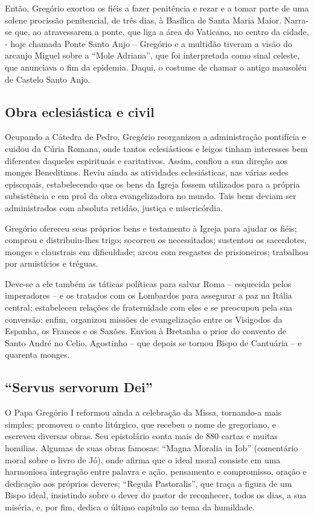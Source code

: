 \documentclass[a4paper,14pt]{extarticle} \usepackage[utf8]{inputenc}
\begin{document}
Então, Gregório exortou os fiéis a fazer penitência e rezar e a tomar parte de uma solene procissão penitencial, de três dias, à Basílica de Santa Maria Maior. Narra-se que, ao atravessarem a ponte, que liga a área do Vaticano, no centro da cidade, - hoje chamada Ponte Santo Anjo – Gregório e a multidão tiveram a visão do arcanjo Miguel sobre a “Mole Adriana”, que foi interpretada como sinal celeste, que anunciava o fim da epidemia. Daqui, o costume de chamar o antigo mausoléu de Castelo Santo Anjo.

\subsection{Obra eclesiástica e civil}

Ocupando a Cátedra de Pedro, Gregório reorganizou a administração pontifícia e cuidou da Cúria Romana, onde tantos eclesiásticos e leigos tinham interesses bem diferentes daqueles espirituais e caritativos. Assim, confiou a sua direção aos monges Beneditinos. Reviu ainda as atividades eclesiásticas, nas várias sedes episcopais, estabelecendo que os bens da Igreja fossem utilizados para a própria subsistência e em prol da obra evangelizadora no mundo. Tais bens deviam ser administrados com absoluta retidão, justiça e misericórdia.

Gregório ofereceu seus próprios bens e testamento à Igreja para ajudar os fiéis; comprou e distribuiu-lhes trigo; socorreu os necessitados; sustentou os sacerdotes, monges e claustrais em dificuldade; arcou com resgastes de prisioneiros; trabalhou por armistícios e tréguas.

Deve-se a ele também as táticas políticas para salvar Roma – esquecida pelos imperadores – e os tratados com os Lombardos para assegurar a paz na Itália central; estabeleceu relações de fraternidade com eles e se preocupou pela sua conversão; enfim, organizou missões de evangelização entre os Visigodos da Espanha, os Francos e os Saxões. Enviou à Bretanha o prior do convento de Santo André no Celio, Agostinho – que depois se tornou Bispo de Cantuária – e quarenta monges.

\subsection{“Servus servorum Dei”}

O Papa Gregório I reformou ainda a celebração da Missa, tornando-a mais simples; promoveu o canto litúrgico, que recebeu o nome de gregoriano, e escreveu diversas obras. Seu epistolário conta mais de 880 cartas e muitas homilias. Algumas de suas obras famosas: “Magna Moralia in Iob” (comentário moral sobre o livro de Jó), onde afirma que o ideal moral consiste em uma harmoniosa integração entre palavra e ação, pensamento e compromisso, oração e dedicação aos próprios deveres; “Regula Pastoralis”, que traça a figura de um Bispo ideal, insistindo sobre o dever do pastor de reconhecer, todos os dias, a sua miséria, e, por fim, dedica o último capítulo ao tema da humildade.
\end{document}
